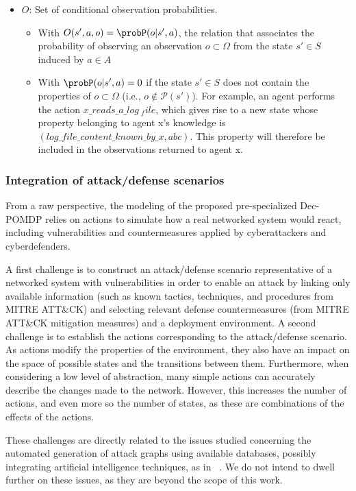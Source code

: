 \begin{itemize}
  \item $O$: Set of conditional observation probabilities.
        \begin{itemize}
          \item With $O(s',a,o) = \probP(o|s',a)$, the relation that associates the probability of observing an observation $o \subset \Omega$ from the state $s' \in S$ induced by $a \in A$
          \item With $\probP (o|s',a) = 0$ if the state $s' \in S$ does not contain the properties of $o \subset \Omega$ (i.e., $o \not\in \mathcal{P}(s')$). For example, an agent performs the action $x\_reads\_a\_log\ _file$, which gives rise to a new state whose property belonging to agent x's knowledge is $(log\_file\_content\_known\_by\_x, \allowbreak abc)$. This property will therefore be included in the observations returned to agent x.
        \end{itemize}

\end{itemize}


\subsubsection {Integration of attack/defense scenarios}

\noindent
From a raw perspective, the modeling of the proposed pre-specialized Dec-POMDP relies on actions to simulate how a real networked system would react, including vulnerabilities and countermeasures applied by cyberattackers and cyberdefenders.

A first challenge is to construct an attack/defense scenario representative of a networked system with vulnerabilities in order to enable an attack by linking only available information (such as known tactics, techniques, and procedures from MITRE ATT\&CK) and selecting relevant defense countermeasures (from MITRE ATT\&CK mitigation measures) and a deployment environment. A second challenge is to establish the actions corresponding to the attack/defense scenario. As actions modify the properties of the environment, they also have an impact on the space of possible states and the transitions between them.
Furthermore, when considering a low level of abstraction, many simple actions can accurately describe the changes made to the network. However, this increases the number of actions, and even more so the number of states, as these are combinations of the effects of the actions.

These challenges are directly related to the issues studied concerning the automated generation of attack graphs using available databases, possibly integrating artificial intelligence techniques, as in ~\cite{GFalco2018}. We do not intend to dwell further on these issues, as they are beyond the scope of this work.

